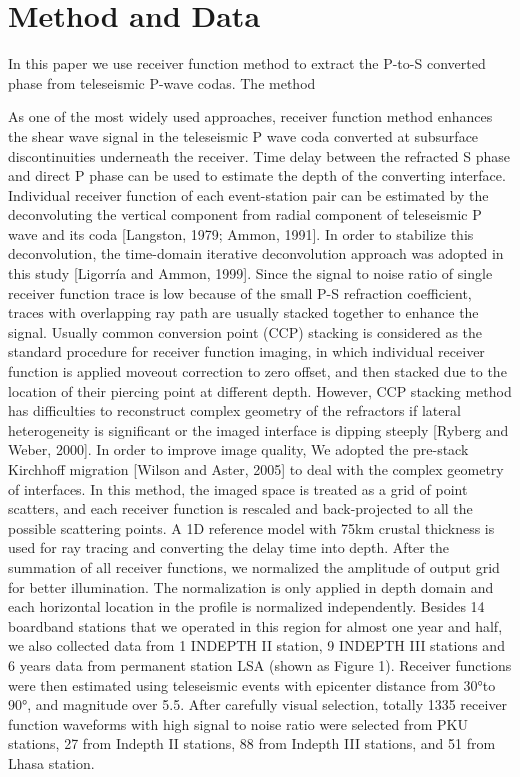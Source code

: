 \section{Method and Data}

In this paper we use receiver function method \cite{Langston_1979,ammon1991isolation} to extract the P-to-S converted phase from teleseismic P-wave codas. The method 



As one of the most widely used approaches, receiver function method enhances the shear wave signal in the teleseismic P wave coda converted at subsurface discontinuities underneath the receiver. Time delay between the refracted S phase and direct P phase can be used to estimate the depth of the converting interface. 
Individual receiver function of each event-station pair can be estimated by the deconvoluting the vertical component from radial component of teleseismic P wave and its coda [Langston, 1979; Ammon, 1991]. In order to stabilize this deconvolution, the time-domain iterative deconvolution approach was adopted in this study [Ligorría and Ammon, 1999].
Since the signal to noise ratio of single receiver function trace is low because of the small P-S refraction coefficient, traces with overlapping ray path are usually stacked together to enhance the signal. Usually common conversion point (CCP) stacking is considered as the standard procedure for receiver function imaging, in which individual receiver function is applied moveout correction to zero offset, and then stacked due to the location of their piercing point at different depth. However, CCP stacking method has difficulties to reconstruct complex geometry of the refractors if lateral heterogeneity is significant or the imaged interface is dipping steeply [Ryberg and Weber, 2000]. In order to improve image quality, We adopted the pre-stack Kirchhoff migration [Wilson and Aster, 2005] to deal with the complex geometry of interfaces. In this method, the imaged space is treated as a grid of point scatters, and each receiver function is rescaled and back-projected to all the possible scattering points. A 1D reference model with 75km crustal thickness is used for ray tracing and converting the delay time into depth. After the summation of all receiver functions, we normalized the amplitude of output grid for better illumination. The normalization is only applied in depth domain and each horizontal location in the profile is normalized independently. 
Besides 14 boardband stations that we operated in this region for almost one year and half, we also collected data from 1 INDEPTH II station, 9 INDEPTH III stations and 6 years data from permanent station LSA (shown as Figure 1). Receiver functions were then estimated using teleseismic events with epicenter distance from 30°to 90°, and magnitude over 5.5. After carefully visual selection, totally 1335 receiver function waveforms with high signal to noise ratio were selected from PKU stations, 27 from Indepth II stations, 88 from Indepth III stations, and 51 from Lhasa station.

